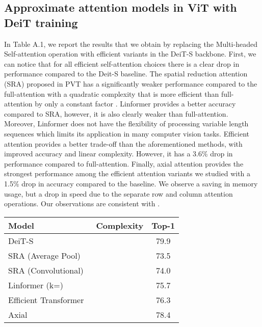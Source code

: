     



\subsection{Approximate attention models in ViT with DeiT training}
\label{sec:approx_att}


In Table A.1, we report the results that we obtain by replacing the Multi-headed Self-attention operation with efficient variants \cite{ho2019axial, shen2021efficient, wang2020linformer, wang2021pyramid} in the DeiT-S backbone.  First, we can notice that for all efficient self-attention choices there is a clear drop in performance compared to the Deit-S baseline. The spatial reduction attention (SRA) proposed in PVT \cite{wang2021pyramid} has a significantly weaker performance compared to the full-attention with a quadratic complexity that is more efficient than full-attention by only a constant factor . Linformer \cite{wang2020linformer} provides a better accuracy compared to SRA, however, it is also clearly weaker than full-attention. Moreover, Linformer does not have the flexibility of processing variable length sequences which limits its application in many computer vision tasks. Efficient attention \cite{shen2021efficient} provides a better trade-off than the aforementioned methods, with improved accuracy and linear complexity. However, it has a 3.6\% drop in performance compared to full-attention. Finally, axial attention \cite{ho2019axial} provides the strongest performance among the efficient attention variants we studied with a 1.5\% drop in accuracy compared to the baseline. We observe a saving in memory usage, but a drop in speed due to the separate row and column attention operations. Our observations are consistent with \cite{dosovitskiy2020image}.
\begin{table}[h!]
\small
{}\vspace*{3pt}
\centering 
\begin{tabular}{l|c|c}
     \toprule    
     Model & Complexity & Top-1  \\
     \midrule
     DeiT-S~\cite{touvron2020deit} &  & 79.9  \\
     \midrule
     SRA (Average Pool)~\cite{wang2021pyramid} &   & 73.5 \\
     SRA (Convolutional)~\cite{wang2021pyramid} &  & 74.0 \\
     Linformer (k=)~\cite{wang2020linformer} &  & 75.7 \\
     Efficient Transformer~\cite{shen2021efficient} &  & 76.3 \\
    Axial~\cite{ho2019axial} &  & 78.4 \\
     \bottomrule
\end{tabular}    
\end{table}


